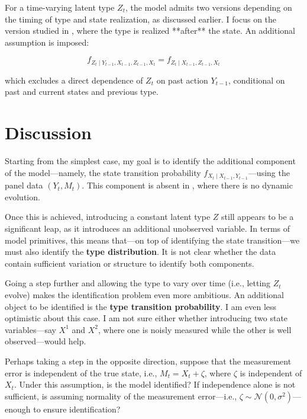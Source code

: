 \documentclass[12pt]{article}
\begin{document}
For a time-varying latent type $Z_t$, the model admits two versions depending on the timing of type and state realization, as discussed earlier. I focus on the version studied in \citet{hu2017simple}, where the type is realized **after** the state. An additional assumption is imposed:

$$
    f_{Z_t \mid Y_{t-1}, X_{t-1}, Z_{t-1}, X_t} = f_{Z_t \mid X_{t-1}, Z_{t-1}, X_t}
$$

which excludes a direct dependence of $Z_t$ on past action $Y_{t-1}$, conditional on past and current states and previous type.

\section{Discussion}

Starting from the simplest case, my goal is to identify the additional component of the model—namely, the state transition probability $f_{X_t \mid X_{t-1}, Y_{t-1}}$—using the panel data $(Y_t, M_t)$. This component is absent in \citet{hu2008identification}, where there is no dynamic evolution.

Once this is achieved, introducing a constant latent type $Z$ still appears to be a significant leap, as it introduces an additional unobserved variable. In terms of model primitives, this means that—on top of identifying the state transition—we must also identify the \textbf{type distribution}. It is not clear whether the data contain sufficient variation or structure to identify both components.

Going a step further and allowing the type to vary over time (i.e., letting $Z_t$ evolve) makes the identification problem even more ambitious. An additional object to be identified is the \textbf{type transition probability}. I am even less optimistic about this case. I am not sure either whether introducing two state variables—say $X^1$ and $X^2$, where one is noisly measured while the other is well observed—would help.

Perhaps taking a step in the opposite direction, suppose that the measurement error is independent of the true state, i.e., \( M_t = X_t + \zeta \), where \( \zeta \) is independent of \( X_t \). Under this assumption, is the model identified? If independence alone is not sufficient, is assuming normality of the measurement error—i.e., \( \zeta \sim \mathcal{N}(0, \sigma^2) \)—enough to ensure identification?

\pagebreak \newpage 
\end{document}
